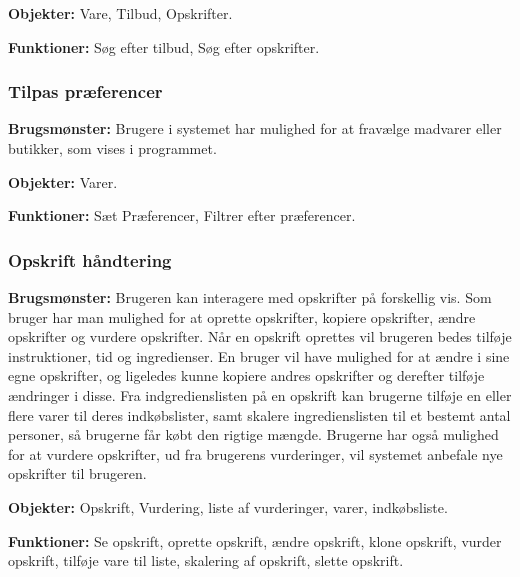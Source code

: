 \textbf{Objekter:} Vare, Tilbud, Opskrifter.

\textbf{Funktioner:} Søg efter tilbud, Søg efter opskrifter.

\subsubsection*{Tilpas præferencer}
\textbf{Brugsmønster:} 
Brugere i systemet har mulighed for at fravælge madvarer eller butikker, som vises i programmet.

\textbf{Objekter:} Varer.

\textbf{Funktioner:} Sæt Præferencer, Filtrer efter præferencer.

\subsubsection*{Opskrift håndtering}
\textbf{Brugsmønster:}
Brugeren kan interagere med opskrifter på forskellig vis. 
Som bruger har man mulighed for at oprette opskrifter, kopiere opskrifter, ændre opskrifter og vurdere opskrifter.
Når en opskrift oprettes vil brugeren bedes tilføje instruktioner, tid og ingredienser.
En bruger vil have mulighed for at ændre i sine egne opskrifter, og ligeledes kunne kopiere andres opskrifter og derefter tilføje ændringer i disse.
Fra indgredienslisten på en opskrift kan brugerne tilføje en eller flere varer til deres indkøbslister, samt skalere ingredienslisten til et bestemt antal personer, så brugerne får købt den rigtige mængde.
Brugerne har også mulighed for at vurdere opskrifter, ud fra brugerens vurderinger, vil systemet anbefale nye opskrifter til brugeren.

\textbf{Objekter:} Opskrift, Vurdering, liste af vurderinger, varer, indkøbsliste.

\textbf{Funktioner:} Se opskrift, oprette opskrift, ændre opskrift, klone opskrift, vurder opskrift, tilføje vare til liste, skalering af opskrift, slette opskrift.

%
%

